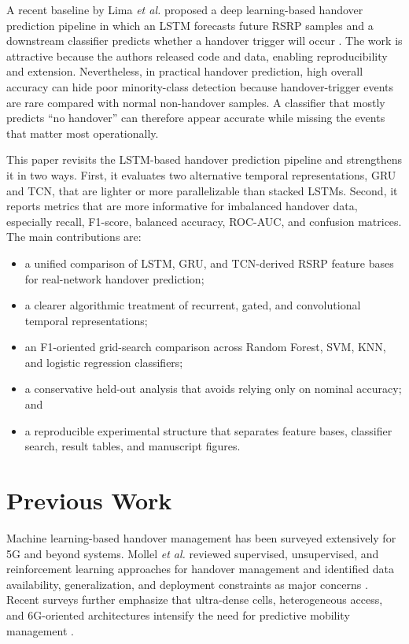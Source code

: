 \documentclass[conference]{IEEEtran}
\begin{document}
A recent baseline by Lima \emph{et al.} proposed a deep learning-based handover prediction pipeline in which an LSTM forecasts future RSRP samples and a downstream classifier predicts whether a handover trigger will occur \cite{lima2023}. The work is attractive because the authors released code and data, enabling reproducibility and extension. Nevertheless, in practical handover prediction, high overall accuracy can hide poor minority-class detection because handover-trigger events are rare compared with normal non-handover samples. A classifier that mostly predicts ``no handover'' can therefore appear accurate while missing the events that matter most operationally.

This paper revisits the LSTM-based handover prediction pipeline and strengthens it in two ways. First, it evaluates two alternative temporal representations, GRU and TCN, that are lighter or more parallelizable than stacked LSTMs. Second, it reports metrics that are more informative for imbalanced handover data, especially recall, F1-score, balanced accuracy, ROC-AUC, and confusion matrices. The main contributions are:
\begin{itemize}
\item a unified comparison of LSTM, GRU, and TCN-derived RSRP feature bases for real-network handover prediction;
\item a clearer algorithmic treatment of recurrent, gated, and convolutional temporal representations;
\item an F1-oriented grid-search comparison across Random Forest, SVM, KNN, and logistic regression classifiers;
\item a conservative held-out analysis that avoids relying only on nominal accuracy; and
\item a reproducible experimental structure that separates feature bases, classifier search, result tables, and manuscript figures.
\end{itemize}

\section{Previous Work}
Machine learning-based handover management has been surveyed extensively for 5G and beyond systems. Mollel \emph{et al.} reviewed supervised, unsupervised, and reinforcement learning approaches for handover management and identified data availability, generalization, and deployment constraints as major concerns \cite{mollel2021}. Recent surveys further emphasize that ultra-dense cells, heterogeneous access, and 6G-oriented architectures intensify the need for predictive mobility management \cite{thillaigovindhan2024}.
\end{document}
